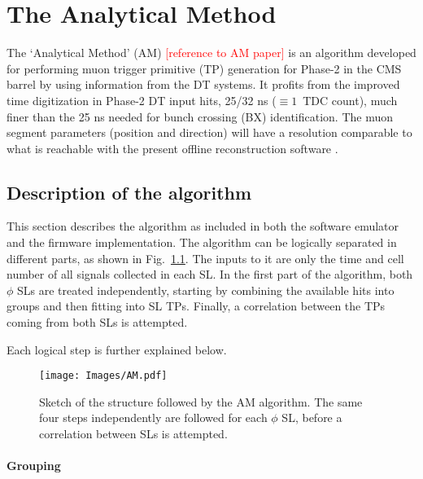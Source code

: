 \documentclass[../main.tex]{subfiles}
\begin{document}
\chapter{The Analytical Method}
\label{dts:chapter:intro}


The `Analytical Method' (AM) \textcolor{red}{[reference to AM paper]} is an algorithm developed for performing muon trigger primitive (TP) generation for Phase-2 in the CMS barrel by using information from the DT systems. It profits from the improved time digitization in Phase-2 DT input hits, 25/32 ns ($\equiv1$~TDC count), much finer than the 25 ns needed for bunch crossing (BX) identification. The muon segment parameters (position and direction) will have a resolution comparable to what is reachable with the present offline reconstruction software \cite{intro:id:muon_7tev}.



\section{Description of the algorithm}
\label{sec:dts:description}

This section describes the algorithm as included in both the software emulator and the firmware implementation. The algorithm can be logically separated in different parts, as shown in Fig.~\ref{dts:fig:am}. The inputs to it are only the time and cell number of all signals collected in each SL. In the first part of the algorithm, both $\phi$ SLs are treated independently, starting by combining the available hits into groups and then fitting into SL TPs. Finally, a correlation between the TPs coming from both SLs is attempted. 

Each logical step is further explained below.





\begin{figure}[h!]
\begin{center}
\texttt{[image: Images/AM.pdf]}
\end{center}
\caption{Sketch of the structure followed by the AM algorithm. The same four steps independently are followed for each $\phi$ SL, before a correlation between SLs is attempted.}
\label{dts:fig:am}
\end{figure}


\subsubsection*{Grouping}
\end{document}
